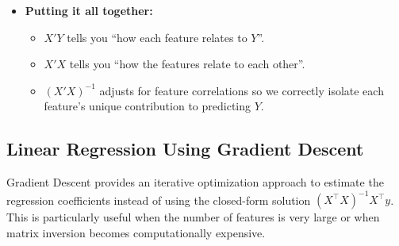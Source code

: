 \documentclass[11pt,a4paper]{article}
\begin{document}
\begin{itemize}
    \item \textbf{Putting it all together:}  
    \begin{itemize}
        \item $X'Y$ tells you ``how each feature relates to $Y$''.  
        \item $X'X$ tells you ``how the features relate to each other''.  
        \item $(X'X)^{-1}$ adjusts for feature correlations so we correctly isolate each feature's unique contribution to predicting $Y$.  
    \end{itemize}
\end{itemize}

\subsection{Linear Regression Using Gradient Descent}

Gradient Descent provides an iterative optimization approach to estimate the regression coefficients instead of using the closed-form solution $(X^\top X)^{-1}X^\top y$. This is particularly useful when the number of features is very large or when matrix inversion becomes computationally expensive.
\end{document}
